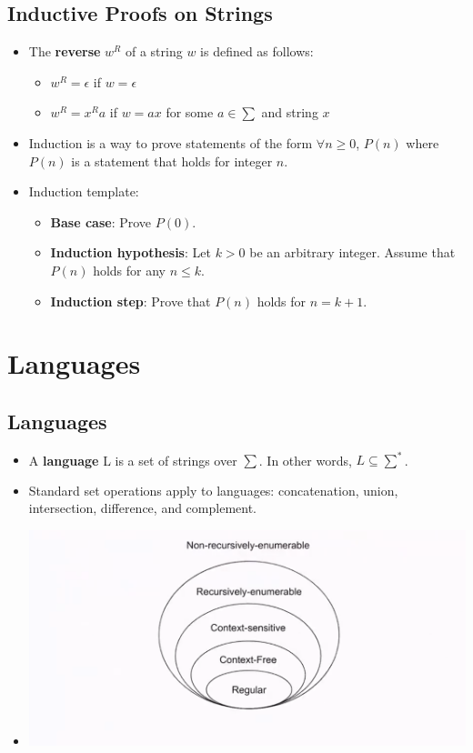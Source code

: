 \documentclass[12pt]{article}
\begin{document}
\subsection{Inductive Proofs on Strings}
\begin{itemize}
    \item The \textbf{reverse} $w^R$ of a string $w$ is defined as follows:
        \begin{itemize}
            \item $w^R = \epsilon$ if $w = \epsilon$
            \item $w^R = x^Ra$ if $w = ax$ for some $a \in \sum$ and string $x$
        \end{itemize}
    \item Induction is a way to prove statements of the form $\forall n \geq 0$, $P(n)$ where $P(n)$ is a statement that holds for integer $n$.
    \item Induction template:
        \begin{itemize}
            \item \textbf{Base case}: Prove $P(0)$.
            \item \textbf{Induction hypothesis}: Let $k > 0$ be an arbitrary integer. Assume that $P(n)$ holds for any $n \leq k$.
            \item \textbf{Induction step}: Prove that $P(n)$ holds for $n = k + 1$.
        \end{itemize}
\end{itemize}

\section{Languages}

\subsection{Languages}
\begin{itemize}
    \item A \textbf{language} L is a set of strings over $\sum$. In other words, $L \subseteq \sum^{\ast}$.
    \item Standard set operations apply to languages: concatenation, union, intersection, difference, and complement.
    \item[] \includegraphics[width=\textwidth]{images/chomsky-hierarchy.png}
\end{itemize}
\end{document}
